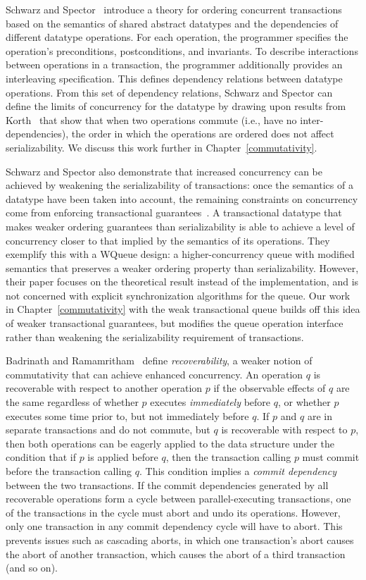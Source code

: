 Schwarz and Spector~\cite{schwarz} introduce a theory for ordering concurrent transactions based on the semantics of shared abstract datatypes and the dependencies of different datatype operations. For each operation, the programmer specifies the operation's preconditions, postconditions, and invariants. To describe interactions between operations in a transaction, the programmer additionally provides an interleaving specification. This defines dependency relations between datatype operations. From this set of dependency relations, Schwarz and Spector can define the limits of concurrency for the datatype by drawing upon results from Korth~\cite{korth} that show that when two operations commute (i.e., have no inter-dependencies), the order in which the operations are ordered does not affect serializability. We discuss this work further in Chapter~\ref{commutativity}. 

Schwarz and Spector also demonstrate that increased concurrency can be achieved by weakening the serializability of transactions: once the semantics of a datatype have been taken into account, the remaining constraints on concurrency come from enforcing transactional guarantees~\cite{kung}. A transactional datatype that makes weaker ordering guarantees than serializability is able to achieve a level of concurrency closer to that implied by the semantics of its operations.
They exemplify this with a WQueue design: a higher-concurrency queue with modified semantics that preserves a weaker ordering property than serializability. However, their paper focuses on the theoretical result instead of the implementation, and is not concerned with explicit synchronization algorithms for the queue. Our work in Chapter~\ref{commutativity} with the weak transactional queue builds off this idea of weaker transactional guarantees, but modifies the queue operation interface rather than weakening the serializability requirement of transactions.

Badrinath and Ramamritham~\cite{badrinath} define \emph{recoverability}, a weaker notion of commutativity that can achieve enhanced concurrency. An operation $q$ is recoverable with respect to another operation $p$ if the observable effects of $q$ are the same regardless of whether $p$ executes \emph{immediately} before $q$, or whether $p$ executes some time prior to, but not immediately before $q$.
If $p$ and $q$ are in separate transactions and do not commute, but $q$ is recoverable with respect to $p$, then both operations can be eagerly applied to the data structure under the condition that if $p$ is applied before $q$, then the transaction calling $p$ must commit before the transaction calling $q$. This condition implies a \emph{commit dependency} between the two transactions. 
If the commit dependencies generated by all recoverable operations form a cycle between parallel-executing transactions, one of the transactions in the cycle must abort and undo its operations. However, only one transaction in any commit dependency cycle will have to abort. This prevents issues such as cascading aborts, in which one transaction's abort causes the abort of another transaction, which causes the abort of a third transaction (and so on).

